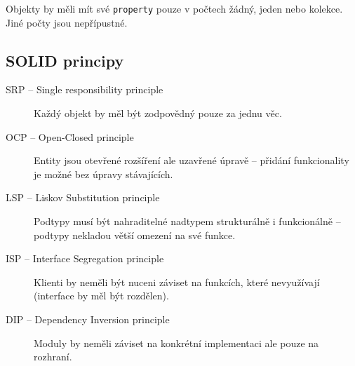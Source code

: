Objekty by měli mít své \texttt{property} pouze v počtech žádný, jeden nebo kolekce.
Jiné počty jsou nepřípustné.

\subsection{SOLID principy}

\begin{description}
    \item[SRP -- Single responsibility principle] Každý objekt by měl být zodpovědný pouze za jednu věc.
    \item[OCP -- Open-Closed principle] Entity jsou otevřené rozšíření ale uzavřené úpravě -- přidání funkcionality je možné bez úpravy stávajících.
    \item[LSP -- Liskov Substitution principle] Podtypy musí být nahraditelné nadtypem strukturálně i funkcionálně -- podtypy nekladou větší omezení na své funkce.
    \item[ISP -- Interface Segregation principle] Klienti by neměli být nuceni záviset na funkcích, které nevyužívají (interface by měl být rozdělen).
    \item[DIP -- Dependency Inversion principle] Moduly by neměli záviset na konkrétní implementaci ale pouze na rozhraní.
\end{description}
